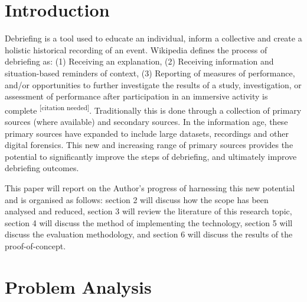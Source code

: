 \documentclass{UoNMCHA}
\newcommand{\citationneeded}{\textsuperscript{\color{blue} [citation needed]}}
\numberwithin{equation}{section}
\begin{document}
\section{Introduction}
Debriefing is a tool used to educate an individual, inform a collective and create a holistic historical recording of an event. Wikipedia defines the process of debriefing as: (1) Receiving an explanation, (2) Receiving information and situation-based reminders of context, (3) Reporting of measures of performance, and/or opportunities to further investigate the results of a study, investigation, or assessment of performance after participation in an immersive activity is complete\citationneeded. Traditionally this is done through a collection of primary sources (where available) and secondary sources. In the information age, these primary sources have expanded to include large datasets, recordings and other digital forensics. This new and increasing range of primary sources provides the potential to significantly improve the steps of debriefing, and ultimately improve debriefing outcomes.

This paper will report on the Author’s progress of harnessing this new potential and is organised as follows: section 2 will discuss how the scope has been analysed and reduced, section 3 will review the literature of this research topic, section 4 will discuss the method of implementing the technology, section 5 will discuss the evaluation methodology, and section 6 will discuss the results of the proof-of-concept.

%

\section{Problem Analysis}\label{sec:ProblemAnalysis}
\end{document}
